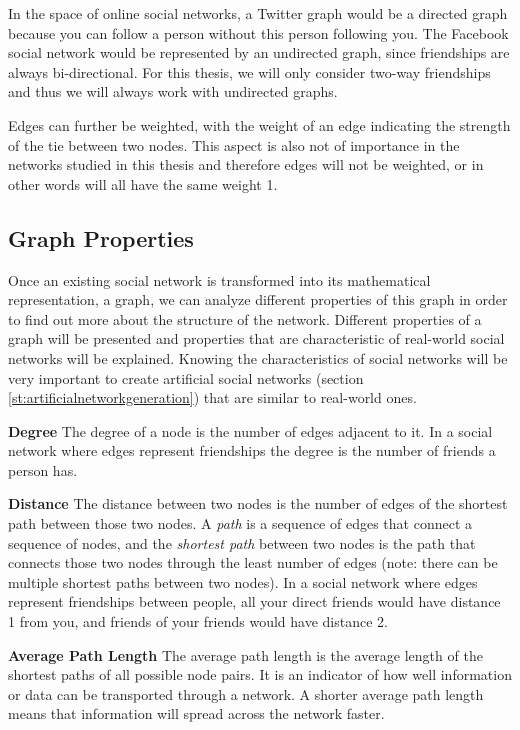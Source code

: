 In the space of online social networks, a Twitter graph would be a directed graph because you can follow a person without this person following you. The Facebook social network would be represented by an undirected graph, since friendships are always bi-directional. For this thesis, we will only consider two-way friendships and thus we will always work with undirected graphs.

Edges can further be weighted, with the weight of an edge indicating the strength of the tie between two nodes. This aspect is also not of importance in the networks studied in this thesis and therefore edges will not be weighted, or in other words will all have the same weight 1.

\subsection{Graph Properties}
\label{sst:graphproperties} Once an existing social network is transformed into its mathematical representation, a graph, we can analyze different properties of this graph in order to find out more about the structure of the network. Different properties of a graph will be presented and properties that are characteristic of real-world social networks will be explained. Knowing the characteristics of social networks will be very important to create artificial social networks (section \ref{st:artificialnetworkgeneration}) that are similar to real-world ones.
\newline

\textbf{Degree} The degree of a node is the number of edges adjacent to it. In a social network where edges represent friendships the degree is the number of friends a person has.
\newline

\textbf{Distance} The distance between two nodes is the number of edges of the shortest path between those two nodes. A \textit{path} is a sequence of edges that connect a sequence of nodes, and the \textit{shortest path} between two nodes is the path that connects those two nodes through the least number of edges (note: there can be multiple shortest paths between two nodes). In a social network where edges represent friendships between people, all your direct friends would have distance 1 from you, and friends of your friends would have distance 2.
\newline

\textbf{Average Path Length} The average path length is the average length of the shortest paths of all possible node pairs. It is an indicator of how well information or data can be transported through a network. A shorter average path length means that information will spread across the network faster.
\newline

